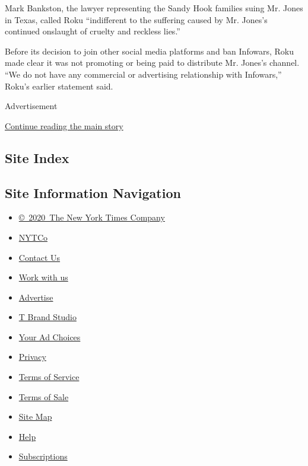 Mark Bankston, the lawyer representing the Sandy Hook families suing Mr.
Jones in Texas, called Roku ``indifferent to the suffering caused by Mr.
Jones's continued onslaught of cruelty and reckless lies.''

Before its decision to join other social media platforms and ban
Infowars, Roku made clear it was not promoting or being paid to
distribute Mr. Jones's channel. ``We do not have any commercial or
advertising relationship with Infowars,'' Roku's earlier statement said.

Advertisement

\protect\hyperlink{after-bottom}{Continue reading the main story}

\hypertarget{site-index}{%
\subsection{Site Index}\label{site-index}}

\hypertarget{site-information-navigation}{%
\subsection{Site Information
Navigation}\label{site-information-navigation}}

\begin{itemize}
\tightlist
\item
  \href{https://help.nytimes3xbfgragh.onion/hc/en-us/articles/115014792127-Copyright-notice}{©~2020~The
  New York Times Company}
\end{itemize}

\begin{itemize}
\tightlist
\item
  \href{https://www.nytco.com/}{NYTCo}
\item
  \href{https://help.nytimes3xbfgragh.onion/hc/en-us/articles/115015385887-Contact-Us}{Contact
  Us}
\item
  \href{https://www.nytco.com/careers/}{Work with us}
\item
  \href{https://nytmediakit.com/}{Advertise}
\item
  \href{http://www.tbrandstudio.com/}{T Brand Studio}
\item
  \href{https://www.nytimes3xbfgragh.onion/privacy/cookie-policy\#how-do-i-manage-trackers}{Your
  Ad Choices}
\item
  \href{https://www.nytimes3xbfgragh.onion/privacy}{Privacy}
\item
  \href{https://help.nytimes3xbfgragh.onion/hc/en-us/articles/115014893428-Terms-of-service}{Terms
  of Service}
\item
  \href{https://help.nytimes3xbfgragh.onion/hc/en-us/articles/115014893968-Terms-of-sale}{Terms
  of Sale}
\item
  \href{https://spiderbites.nytimes3xbfgragh.onion}{Site Map}
\item
  \href{https://help.nytimes3xbfgragh.onion/hc/en-us}{Help}
\item
  \href{https://www.nytimes3xbfgragh.onion/subscription?campaignId=37WXW}{Subscriptions}
\end{itemize}
